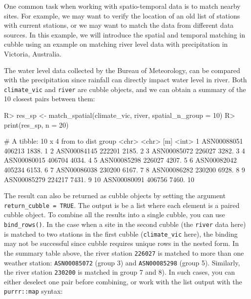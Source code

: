 \documentclass[
]{jss}
\begin{document}
One common task when working with spatio-temporal data is to match
nearby sites. For example, we may want to verify the location of an old
list of stations with current stations, or we may want to match the data
from different data sources. In this example, we will introduce the
spatial and temporal matching in cubble using an example on matching
river level data with precipitation in Victoria, Australia.

The water level data collected by the Bureau of Meteorology, can be
compared with the precipitation since rainfall can directly impact water
level in river. Both \texttt{climate\_vic} and \texttt{river} are cubble
objects, and we can obtain a summary of the 10 closest pairs between
them:

\begin{CodeChunk}
\begin{CodeInput}
R> res_sp <- match_spatial(climate_vic, river, spatial_n_group = 10)
R> print(res_sp, n = 20)
\end{CodeInput}
\begin{CodeOutput}
# A tibble: 10 x 4
   from        to      dist group
   <chr>       <chr>    [m] <int>
 1 ASN00088051 406213 1838.     1
 2 ASN00084145 222201 2185.     2
 3 ASN00085072 226027 3282.     3
 4 ASN00080015 406704 4034.     4
 5 ASN00085298 226027 4207.     5
 6 ASN00082042 405234 6153.     6
 7 ASN00086038 230200 6167.     7
 8 ASN00086282 230200 6928.     8
 9 ASN00085279 224217 7431.     9
10 ASN00080091 406756 7460.    10
\end{CodeOutput}
\end{CodeChunk}

The result can also be returned as cubble objects by setting the
argument \texttt{return\_cubble\ =\ TRUE}. The output is be a list where
each element is a paired cubble object. To combine all the results into
a single cubble, you can use \texttt{bind\_rows()}. In the case when a
site in the second cubble (the \texttt{river} data here) is matched to
two stations in the first cubble (\texttt{climate\_vic} here), the
binding may not be successful since cubble requires unique rows in the
nested form. In the summary table above, the river station
\texttt{226027} is matched to more than one weather station:
\texttt{ASN00085072} (group 3) and \texttt{ASN00085298} (group 5).
Similarly, the river station \texttt{230200} is matched in group 7 and
8). In such cases, you can either deselect one pair before combining, or
work with the list output with the \texttt{purrr::map} syntax:
\end{document}
